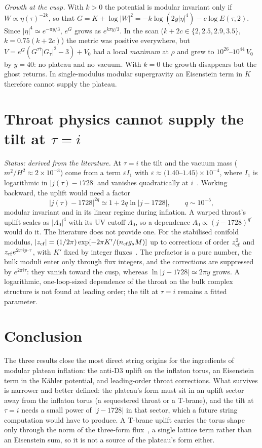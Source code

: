 \documentclass[aps,prd,twocolumn,superscriptaddress,nofootinbib,showkeys]{revtex4-2}
\begin{document}
\emph{Growth at the cusp.} With $k>0$ the potential is modular invariant only if $W\propto\eta(\tau)^{-2k}$, so that $G=K+\log|W|^2=-k\log(2y|\eta|^4)-c\log E(\tau,2)$. Since $|\eta|^4\simeq e^{-\pi y/3}$, $e^G$ grows as $e^{k\pi y/3}$. In the scan ($k+2c\in\{2,2.5,2.9,3.5\}$, $k=0.75(k+2c)$) the metric was positive everywhere, but $V=e^G(G^{\tau\bar\tau}|G_\tau|^2-3)+V_0$ had a local \emph{maximum} at $\rho$ and grew to $10^{26}$--$10^{44}\,V_0$ by $y=40$: no plateau and no vacuum. With $k=0$ the growth disappears but the ghost returns. In single-modulus modular supergravity an Eisenstein term in $K$ therefore cannot supply the plateau.

\section{Throat physics cannot supply the tilt at $\tau=i$}
\emph{Status: derived from the literature.}
At $\tau=i$ the tilt and the vacuum mass ($m^2/H^2\approx2\times10^{-3}$) come from a term $\varepsilon I_1$ with $\varepsilon\approx(1.40$--$1.45)\times10^{-4}$, where $I_1$ is logarithmic in $|j(\tau)-1728|$ and vanishes quadratically at $i$~\cite{SERAPIS}. Working backward, the uplift would need a factor
\begin{equation}
|j(\tau)-1728|^{2q}\simeq1+2q\ln|j-1728|,\qquad q\sim10^{-5},
\end{equation}
modular invariant and in its linear regime during inflation. A warped throat's uplift scales as $|\Lambda_0|^4$ with its UV cutoff $\Lambda_0$, so a dependence $\Lambda_0\propto(j-1728)^{q'}$ would do it. The literature does not provide one. For the stabilised conifold modulus, $|z_{\rm cf}|=(1/2\pi)\exp[-2\pi K'/(n_{\rm cf}g_sM)]$ up to corrections of order $z_{\rm cf}^2$ and $z_{\rm cf}e^{2\pi i p\cdot\tau}$, with $K'$ fixed by integer fluxes~\cite{DKMM}. The prefactor is a pure number, the bulk moduli enter only through flux integers, and the corrections are suppressed by $e^{2\pi i\tau}$: they vanish toward the cusp, whereas $\ln|j-1728|\simeq2\pi y$ grows. A logarithmic, one-loop-sized dependence of the throat on the bulk complex structure is not found at leading order; the tilt at $\tau=i$ remains a fitted parameter.

\section{Conclusion}
The three results close the most direct string origins for the ingredients of modular plateau inflation: the anti-D3 uplift on the inflaton torus, an Eisenstein term in the Kähler potential, and leading-order throat corrections. What survives is narrower and better defined: the plateau's form must sit in an uplift sector away from the inflaton torus (a sequestered throat or a T-brane), and the tilt at $\tau=i$ needs a small power of $|j-1728|$ in that sector, which a future string computation would have to produce. A T-brane uplift carries the torus shape only through the norm of the three-form flux~\cite{TBRANE}, a single lattice term rather than an Eisenstein sum, so it is not a source of the plateau's form either.
\end{document}
